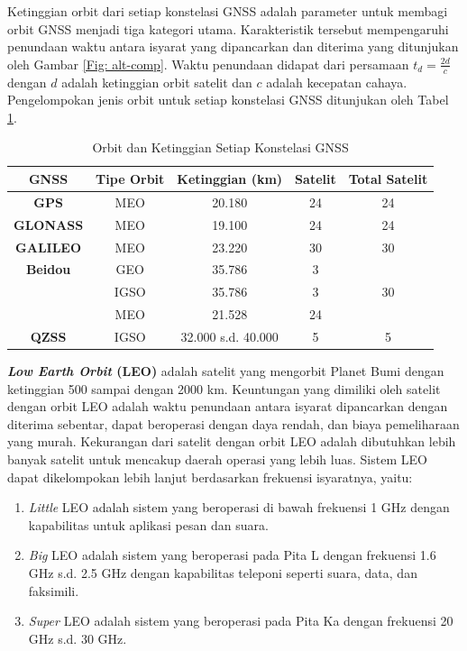 Ketinggian orbit dari setiap konstelasi GNSS adalah parameter untuk membagi orbit GNSS menjadi tiga kategori utama. Karakteristik tersebut mempengaruhi penundaan waktu antara isyarat yang dipancarkan dan diterima yang ditunjukan oleh Gambar \ref{Fig: alt-comp}. Waktu penundaan didapat dari persamaan $t_d = \frac{2d}{c}$ dengan $d$ adalah ketinggian orbit satelit dan $c$ adalah kecepatan cahaya. Pengelompokan jenis orbit untuk setiap konstelasi GNSS ditunjukan oleh Tabel \ref{Tab: gnss-orbit}.

\begin{table}[H]
	\caption{Orbit dan Ketinggian Setiap Konstelasi GNSS \cite{Li2019} \cite{Bury2019}}
	\vspace{0.5em}
	\centering
	\begin{tabular}{ccccc}
		\hline
		\textbf{GNSS} &\textbf{Tipe Orbit} & \textbf{Ketinggian (km)} & \textbf{Satelit} & \textbf{Total Satelit}\\
		\hline 
		\textbf{GPS} & MEO & 20.180 & 24 & 24\\
		\textbf{GLONASS} & MEO & 19.100 & 24 & 24\\
		\textbf{GALILEO} & MEO & 23.220 & 30 & 30\\
		\textbf{Beidou} & GEO & 35.786 & 3\\
		& IGSO & 35.786 & 3 & 30\\
		& MEO& 21.528 & 24\\
		\textbf{QZSS} & IGSO &32.000 s.d. 40.000 & 5 & 5\\
		\hline
	\end{tabular}
	\label{Tab: gnss-orbit}
\end{table}

\textbf{\textit{Low Earth Orbit} (LEO)} adalah satelit yang mengorbit Planet Bumi dengan ketinggian 500 sampai dengan 2000 km. Keuntungan yang dimiliki oleh satelit dengan orbit LEO adalah waktu penundaan antara isyarat dipancarkan dengan diterima sebentar, dapat beroperasi dengan daya rendah, dan biaya pemeliharaan yang murah. Kekurangan dari satelit dengan orbit LEO adalah dibutuhkan lebih banyak satelit untuk mencakup daerah operasi yang lebih luas. Sistem LEO dapat dikelompokan lebih lanjut berdasarkan frekuensi isyaratnya, yaitu:

\begin{enumerate}
	\item \textit{Little} LEO adalah sistem yang beroperasi di bawah frekuensi 1 GHz dengan kapabilitas untuk aplikasi pesan dan suara.
	\item \textit{Big} LEO adalah sistem yang beroperasi pada Pita L dengan frekuensi 1.6 GHz s.d. 2.5 GHz dengan kapabilitas teleponi seperti suara, data, dan faksimili.
	\item \textit{Super} LEO adalah sistem yang beroperasi pada Pita Ka dengan frekuensi 20 GHz s.d. 30 GHz.
\end{enumerate}

